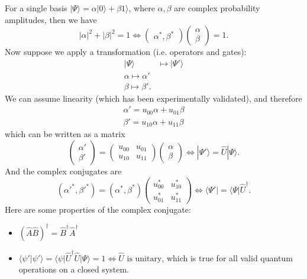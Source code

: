 \documentclass{article}
\numberwithin{equation}{section}
\begin{document}
For a single basis $|\Psi \rangle = \alpha |0\rangle + \beta 1\rangle$, where $\alpha,\beta$ are complex probability amplitudes, then we have
\begin{equation}
    |\alpha|^2+|\beta|^2 = 1 \iff \begin{pmatrix}
        \alpha^*, \beta^*
    \end{pmatrix}\begin{pmatrix}
        \alpha \\ \beta 
    \end{pmatrix} = 1.
\end{equation}
Now suppose we apply a transformation (i.e. operators and gates): 
\begin{align*}
    |\Psi \rangle &\mapsto |\Psi'\rangle \\ 
    \alpha \mapsto \alpha' \\
    \beta \mapsto \beta'.
\end{align*}
We can assume linearity (which has been experimentally validated), and therefore
\begin{align*}
    \alpha' = u_{00}\alpha + u_{01}\beta \\ 
    \beta' = u_{10}\alpha + u_{11}\beta
\end{align*}
which can be written as a matrix
\begin{equation}
    \begin{pmatrix}
        \alpha' \\ \beta'
    \end{pmatrix} = \begin{pmatrix}
        u_{00} & u_{01} \\ u_{10} & u_{11}\end{pmatrix} \begin{pmatrix}
        \alpha \\ \beta
    \end{pmatrix} \iff |\Psi'\rangle = \hat{U} |\Psi\rangle.
\end{equation}
And the complex conjugates are
\begin{equation}
    (\alpha'^*, \beta'^*) = (\alpha^*,\beta^*)\begin{pmatrix}
        u_{00}^* & u_{10}^* \\ u_{01}^* & u_{11}^*
    \end{pmatrix} \iff \langle \Psi'| = \langle \Psi | \hat{U}^\dagger.
\end{equation}
Here are some properties of the complex conjugate:
\begin{itemize}
    \item $(\hat{A}\hat{B})^\dagger = \hat{B}^\dagger\hat{A}^\dagger$
    \item $\langle \psi'|\psi'\rangle = \langle \psi | \hat{U}^\dagger\hat{U} | \Psi\rangle = 1 \iff \hat{U} \text{ is unitary,}$ which is true for all valid quantum operations on a closed system.
\end{itemize}
\end{document}

